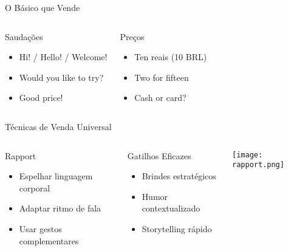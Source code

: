 \documentclass[12pt]{beamer}
\begin{document}
\begin{frame}{O Básico que Vende}
  \begin{columns}
    \begin{exampleblock}{Saudações}
      \begin{itemize}
        \item Hi! / Hello! / Welcome!
        \item Would you like to try?
        \item Good price!
      \end{itemize}
    \end{exampleblock}

    \begin{exampleblock}{Preços}
      \begin{itemize}
        \item Ten reais (10 BRL)
        \item Two for fifteen
        \item Cash or card?
      \end{itemize}
    \end{exampleblock}

  \end{columns}
\end{frame}

\begin{frame}{Técnicas de Venda Universal}
  \begin{columns}
    \begin{block}{Rapport}
      \begin{itemize}
        \item Espelhar linguagem corporal
        \item Adaptar ritmo de fala
        \item Usar gestos complementares
      \end{itemize}
    \end{block}
    
    \begin{alertblock}{Gatilhos Eficazes}
      \begin{itemize}
        \item Brindes estratégicos
        \item Humor contextualizado
        \item Storytelling rápido
      \end{itemize}
    \end{alertblock}
    
    \texttt{[image: rapport.png]}
  \end{columns}
\end{frame}
\end{document}
